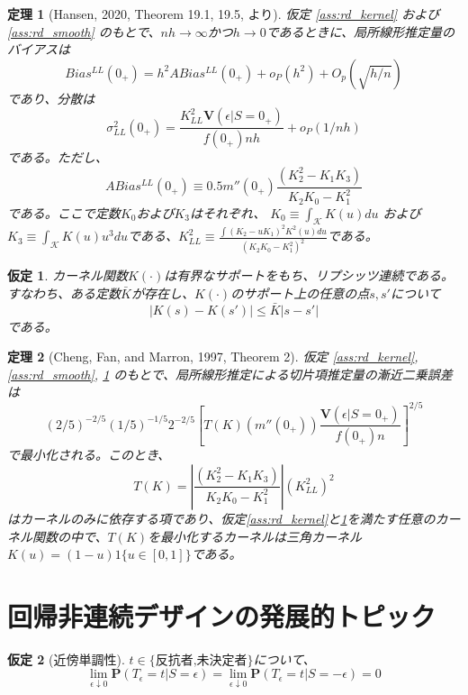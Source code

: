 \documentclass[a4paper]{bxjsarticle}
\newtheorem{theo}{定理}
\newtheorem{ass}{仮定}
\begin{document}
\begin{theo}[Hansen, 2020, Theorem 19.1, 19.5, より]\label{thm:rd_kernel_est}
仮定 \ref{ass:rd_kernel} および \ref{ass:rd_smooth} のもとで、$nh \rightarrow \infty$かつ$h \rightarrow 0$であるときに、局所線形推定量のバイアスは
\[
 Bias^{LL}(0_+) = h^2 ABias^{LL}(0_+) + o_P(h^2) + O_p(\sqrt{h/n})
\]
であり、分散は
\[
 \sigma_{LL}^2(0_+) = \frac{K_{LL}^2 \mathbf{V}(\epsilon|S=0_+)}{f(0_+) nh} + o_P(1/nh)
\]
である。ただし、
\[
 ABias^{LL}(0_+) \equiv 0.5 m''(0_+) \frac{(K_2^2 - K_1 K_3)}{K_2 K_0 - K_1^2}
\]
である。ここで定数$K_0$および$K_3$はそれぞれ、
$K_0 \equiv \int_{\mathcal{K}} K(u) du$ および $K_3 \equiv \int_{\mathcal{K}} K(u) u^3 du$である、$K_{LL}^2 \equiv \frac{\int (K_2 - uK_1)^2 K^2(u) du}{(K_2 K_0 - K_1^2)^2}$である。
\end{theo}

\begin{ass}\label{ass:rd_kernel_additional}
 カーネル関数$K(\cdot)$は有界なサポートをもち、リプシッツ連続である。すなわち、ある定数$\bar{K}$が存在し、$K(\cdot)$のサポート上の任意の点$s,s'$について
 \[
  |K(s) - K(s')| \leq \bar{K}|s - s'|
 \]
 である。
\end{ass}

\begin{theo}[Cheng, Fan, and Marron, 1997, Theorem 2]
仮定 \ref{ass:rd_kernel}, \ref{ass:rd_smooth}, \ref{ass:rd_kernel_additional} のもとで、局所線形推定による切片項推定量の漸近二乗誤差は
\[
 (2/5)^{-2/5} (1/5)^{-1/5} 2^{-2/5}\left[T(K) (m''(0_+)) \frac{\mathbf{V}(\epsilon|S=0_+)}{f(0_+)n}\right]^{2/5}
\]
で最小化される。このとき、
\[
 T(K) = \left|\frac{(K_2^2 - K_1 K_3)}{K_2 K_0 - K_1^2}\right|\left(K_{LL}^2\right)^2
\]
はカーネルのみに依存する項であり、仮定\ref{ass:rd_kernel}と\ref{ass:rd_kernel_additional}を満たす任意のカーネル関数の中で、$T(K)$を最小化するカーネルは三角カーネル$K(u) = (1-u)1\{u \in [0,1]\}$である。
\end{theo}

\section{回帰非連続デザインの発展的トピック}

\begin{ass}[近傍単調性] \label{ass:rd_local_monotone}
$t \in \{\text{反抗者,未決定者}\}$について、
\[
\lim_{\epsilon \downarrow 0} \mathbf{P}(T_{\epsilon} = t|S = \epsilon) = \lim_{\epsilon \downarrow 0} \mathbf{P}(T_{\epsilon} = t|S = -\epsilon) = 0
\]
\end{ass}
\end{document}
